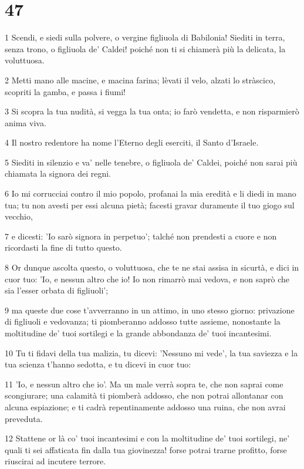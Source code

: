 \chapter{47}

\par 1 Scendi, e siedi sulla polvere, o vergine figliuola di Babilonia! Siediti in terra, senza trono, o figliuola de' Caldei! poiché non ti si chiamerà più la delicata, la voluttuosa.
\par 2 Metti mano alle macine, e macina farina; lèvati il velo, alzati lo stràscico, scopriti la gamba, e passa i fiumi!
\par 3 Si scopra la tua nudità, si vegga la tua onta; io farò vendetta, e non risparmierò anima viva.
\par 4 Il nostro redentore ha nome l'Eterno degli eserciti, il Santo d'Israele.
\par 5 Siediti in silenzio e va' nelle tenebre, o figliuola de' Caldei, poiché non sarai più chiamata la signora dei regni.
\par 6 Io mi corrucciai contro il mio popolo, profanai la mia eredità e li diedi in mano tua; tu non avesti per essi alcuna pietà; facesti gravar duramente il tuo giogo sul vecchio,
\par 7 e dicesti: 'Io sarò signora in perpetuo'; talché non prendesti a cuore e non ricordasti la fine di tutto questo.
\par 8 Or dunque ascolta questo, o voluttuosa, che te ne stai assisa in sicurtà, e dici in cuor tuo: 'Io, e nessun altro che io! Io non rimarrò mai vedova, e non saprò che sia l'esser orbata di figliuoli';
\par 9 ma queste due cose t'avverranno in un attimo, in uno stesso giorno: privazione di figliuoli e vedovanza; ti piomberanno addosso tutte assieme, nonostante la moltitudine de' tuoi sortilegi e la grande abbondanza de' tuoi incantesimi.
\par 10 Tu ti fidavi della tua malizia, tu dicevi: 'Nessuno mi vede', la tua saviezza e la tua scienza t'hanno sedotta, e tu dicevi in cuor tuo:
\par 11 'Io, e nessun altro che io'. Ma un male verrà sopra te, che non saprai come scongiurare; una calamità ti piomberà addosso, che non potrai allontanar con alcuna espiazione; e ti cadrà repentinamente addosso una ruina, che non avrai preveduta.
\par 12 Stattene or là co' tuoi incantesimi e con la moltitudine de' tuoi sortilegi, ne' quali ti sei affaticata fin dalla tua giovinezza! forse potrai trarne profitto, forse riuscirai ad incutere terrore.
